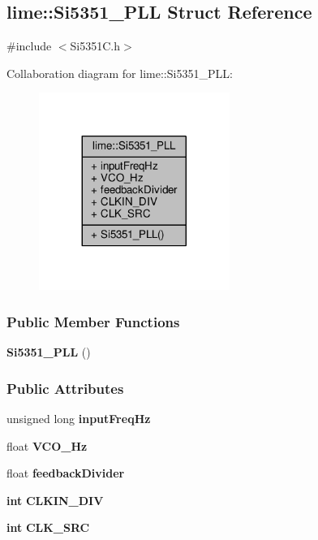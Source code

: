 \subsection{lime\+:\+:Si5351\+\_\+\+P\+LL Struct Reference}
\label{structlime_1_1Si5351__PLL}


{\ttfamily \#include $<$Si5351\+C.\+h$>$}



Collaboration diagram for lime\+:\+:Si5351\+\_\+\+P\+LL\+:
\nopagebreak
\begin{figure}[H]
\begin{center}
\leavevmode
\includegraphics[width=176pt]{db/dbb/structlime_1_1Si5351__PLL__coll__graph}
\end{center}
\end{figure}
\subsubsection*{Public Member Functions}
\begin{DoxyCompactItemize}
\item 
{\bf Si5351\+\_\+\+P\+LL} ()
\end{DoxyCompactItemize}
\subsubsection*{Public Attributes}
\begin{DoxyCompactItemize}
\item 
unsigned long {\bf input\+Freq\+Hz}
\item 
float {\bf V\+C\+O\+\_\+\+Hz}
\item 
float {\bf feedback\+Divider}
\item 
{\bf int} {\bf C\+L\+K\+I\+N\+\_\+\+D\+IV}
\item 
{\bf int} {\bf C\+L\+K\+\_\+\+S\+RC}
\end{DoxyCompactItemize}


